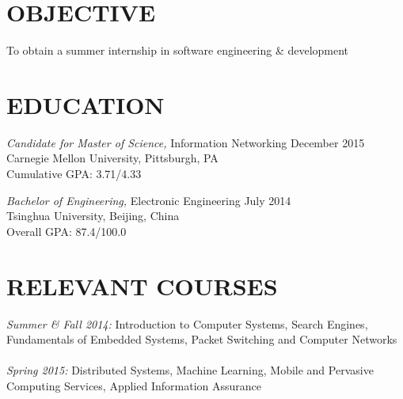 \documentclass[margin, 10pt]{res} %
\begin{document}
\begin{resume}


\section{OBJECTIVE}

To obtain a summer internship in software engineering \& development


\section{EDUCATION}
{\sl Candidate for Master of Science,} Information Networking \hfill December 2015 \\
Carnegie Mellon University, Pittsburgh, PA \\
Cumulative GPA: 3.71/4.33 

{\sl Bachelor of Engineering,} Electronic Engineering \hfill July 2014 \\
Tsinghua University, Beijing, China \\
Overall GPA: 87.4/100.0

\section{RELEVANT COURSES}
{\sl Summer \& Fall 2014:} Introduction to Computer Systems, Search Engines, Fundamentals of Embedded Systems, Packet Switching and Computer Networks \\ \\
{\sl Spring 2015:} Distributed Systems, Machine Learning, Mobile and Pervasive Computing Services, Applied Information Assurance


\end{resume}
\end{document}
